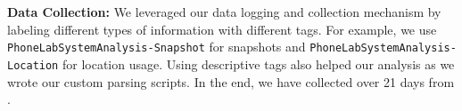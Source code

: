{\bf Data Collection:} We leveraged our data logging and collection mechanism by
labeling different types of information with different tags. For example,
we use \texttt{PhoneLabSystemAnalysis-Snapshot} for snapshots and
\texttt{PhoneLabSystemAnalysis-Location} for location usage.
Using 
descriptive tags also helped our analysis as we wrote our custom parsing
scripts. In the end, we have collected  over 21 days from .

